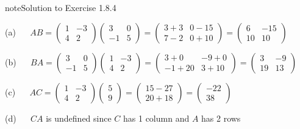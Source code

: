 \documentclass[letterpaper,10pt,english]{jupyterBook}
\begin{document}
 \label{_pages/A1_Matrices_exercises_solutions:_pages/A1_Matrices_exercises_solutions-solution-3}

\begin{sphinxadmonition}{note}{Solution to Exercise 1.8.4}



\sphinxAtStartPar
(a)   \(AB = \begin{pmatrix} 1 & -3 \\ 4 & 2 \end{pmatrix} \begin{pmatrix} 3 & 0 \\ -1 & 5 \end{pmatrix} = \begin{pmatrix} 3 + 3 & 0 - 15 \\ 7 - 2 & 0 + 10 \end{pmatrix} = \begin{pmatrix}6 & -15 \\ 10 & 10 \end{pmatrix}\)

\sphinxAtStartPar
(b)   \(BA = \begin{pmatrix} 3 & 0 \\ -1 & 5 \end{pmatrix}\begin{pmatrix} 1 & -3 \\ 4 & 2 \end{pmatrix} = \begin{pmatrix} 3 + 0 & -9 + 0 \\ -1 + 20 & 3 + 10 \end{pmatrix} = \begin{pmatrix} 3 & -9 \\ 19 & 13 \end{pmatrix}\)

\sphinxAtStartPar
(c)   \(AC = \begin{pmatrix} 1 & -3 \\ 4 & 2 \end{pmatrix}\begin{pmatrix} 5 \\ 9 \end{pmatrix} = \begin{pmatrix} 15 - 27 \\ 20 + 18 \end{pmatrix} = \begin{pmatrix} -22 \\ 38 \end{pmatrix}\)

\sphinxAtStartPar
(d)   \(CA\) is undefined since \(C\) has 1 column and \(A\) has 2 rows


\end{sphinxadmonition}
\end{document}
